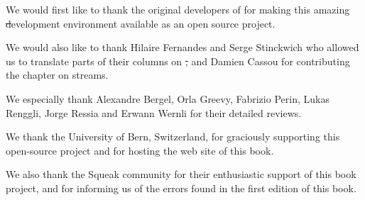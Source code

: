 \documentclass[a4paper,10pt,twoside]{book}
\begin{document}
We would first like to thank the original developers of \squeak for making this amazing \st development environment available as an open source project.

We would also like to thank Hilaire Fernandes and Serge Stinckwich who allowed us to translate parts of their columns on \st, and Damien Cassou for contributing the chapter on streams.

We especially thank Alexandre Bergel, Orla Greevy, Fabrizio Perin, Lukas Renggli, Jorge Ressia and Erwann Wernli for their detailed reviews.

We thank the University of Bern, Switzerland, for graciously supporting this open-source project and for hosting the web site of this book.

We also thank the Squeak community for their enthusiastic support of this book project, and for informing us of the errors found in the first edition of this book.

\ifx\wholebook\relax\else
   
   
\end{document}
